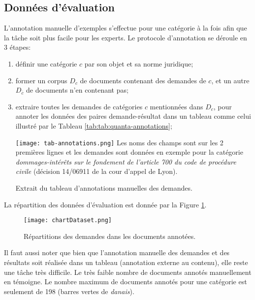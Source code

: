 \subsection{Données d'évaluation}
L'annotation manuelle d'exemples s'effectue pour une catégorie à la fois afin que la tâche soit plus facile pour les experts. Le protocole d'annotation se déroule en 3 étapes: 
\begin{enumerate}
	\item définir une catégorie $c$ par son objet et sa norme juridique;
	\item former un corpus $D_c$ de documents contenant des demandes de $c$, et un autre $D_{\overline{c}}$ de documents n'en contenant pas; 
	\item extraire toutes les demandes de catégories $c$ mentionnées dans $D_c$, pour annoter les données des paires demande-résultat dans un tableau comme celui illustré par le Tableau \ref{tab:tab:quanta-annotations};
	
	\begin{table}[!htb]
		\texttt{[image: tab-annotations.png]}
		\scriptsize{Les noms des champs sont sur les 2 premières lignes et les demandes sont données en exemple pour la catégorie \textit{dommages-intérêts sur le fondement de l'article 700 du code de procédure civile} (décision 14/06911 de la cour d'appel de Lyon).}
		\caption{Extrait du tableau d'annotations manuelles des demandes.} \label{tab:tab:quanta-annotations}
	\end{table}
\end{enumerate}


 
 La répartition des données d'évaluation est donnée par la Figure \ref{fig:quanta:hist-repartition-docs}. 
 
 \begin{figure}[!htb]
 	\texttt{[image: chartDataset.png]}
 	\caption{Répartitions des demandes dans les documents annotées.}\label{fig:quanta:hist-repartition-docs}
 \end{figure}
 
 Il faut aussi noter que bien que l'annotation manuelle des demandes et des résultats soit réalisée dans un tableau (annotation externe au contenu), elle reste une tâche très difficile. Le très faible nombre de documents annotés manuellement en témoigne. Le nombre maximum de documents annotés pour une catégorie est seulement de 198 (barres vertes de \textit{danais}). 

